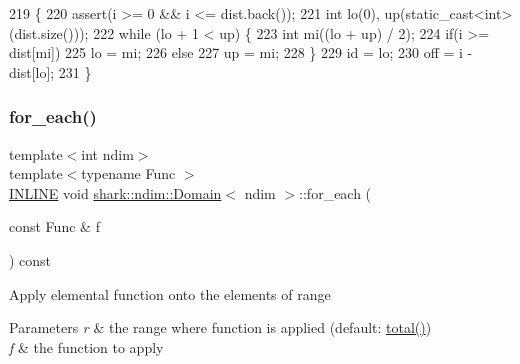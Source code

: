 \begin{DoxyCode}
219                                                                                 \{
220     assert(i >= 0 && i <= dist.back());
221     \textcolor{keywordtype}{int} lo(0), up(static\_cast<int>(dist.size()));
222     \textcolor{keywordflow}{while} (lo + 1 < up) \{
223         \textcolor{keywordtype}{int} mi((lo + up) / 2);
224         \textcolor{keywordflow}{if}(i >= dist[mi])
225             lo = mi;
226         \textcolor{keywordflow}{else}
227             up = mi;
228     \}
229     \textcolor{keywordtype}{id} = lo;
230     off = i - dist[lo];
231 \}
\end{DoxyCode}
\hypertarget{classshark_1_1ndim_1_1_domain_aa234c8c238090b7dd05f9df07c39f223}{}\label{classshark_1_1ndim_1_1_domain_aa234c8c238090b7dd05f9df07c39f223} 
\subsubsection{\texorpdfstring{for\+\_\+each()}{for\_each()}\hspace{0.1cm}{\footnotesize\ttfamily [1/3]}}
{\footnotesize\ttfamily template$<$int ndim$>$ \\
template$<$typename Func $>$ \\
\hyperlink{common_8hpp_a2eb6f9e0395b47b8d5e3eeae4fe0c116}{I\+N\+L\+I\+NE} void \hyperlink{classshark_1_1ndim_1_1_domain}{shark\+::ndim\+::\+Domain}$<$ ndim $>$\+::for\+\_\+each (\begin{DoxyParamCaption}\item[{const Func \&}]{f }\end{DoxyParamCaption}) const}

Apply elemental function onto the elements of range 
\begin{DoxyParams}{Parameters}
{\em r} & the range where function is applied (default\+: \hyperlink{classshark_1_1ndim_1_1_domain_ae4357c99519b3efbaf2544828629de87}{total()}) \\
\hline
{\em f} & the function to apply \\
\hline
\end{DoxyParams}
\hypertarget{classshark_1_1ndim_1_1_domain_a109960d03c4d1900acbb482d1be9c284}{}\label{classshark_1_1ndim_1_1_domain_a109960d03c4d1900acbb482d1be9c284} 
